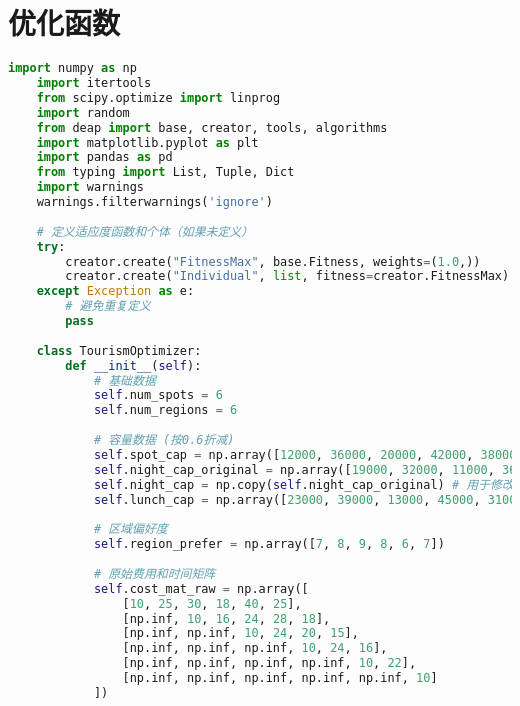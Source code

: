 \section[\hspace{-2pt}优化函数]{{\heiti{} \hspace{-8pt}优化函数}}
\begin{lstlisting}[language=Python]
    import numpy as np
    import itertools
    from scipy.optimize import linprog
    import random
    from deap import base, creator, tools, algorithms
    import matplotlib.pyplot as plt
    import pandas as pd
    from typing import List, Tuple, Dict
    import warnings
    warnings.filterwarnings('ignore')
    
    # 定义适应度函数和个体（如果未定义）
    try:
        creator.create("FitnessMax", base.Fitness, weights=(1.0,))
        creator.create("Individual", list, fitness=creator.FitnessMax)
    except Exception as e:
        # 避免重复定义
        pass
    
    class TourismOptimizer:
        def __init__(self):
            # 基础数据
            self.num_spots = 6
            self.num_regions = 6
            
            # 容量数据 (按0.6折减)
            self.spot_cap = np.array([12000, 36000, 20000, 42000, 38000, 30000]) * 0.6
            self.night_cap_original = np.array([19000, 32000, 11000, 36000, 23000, 22000]) * 0.6
            self.night_cap = np.copy(self.night_cap_original) # 用于修改的容量
            self.lunch_cap = np.array([23000, 39000, 13000, 45000, 31000, 28000]) * 0.6
            
            # 区域偏好度
            self.region_prefer = np.array([7, 8, 9, 8, 6, 7])
            
            # 原始费用和时间矩阵
            self.cost_mat_raw = np.array([
                [10, 25, 30, 18, 40, 25],
                [np.inf, 10, 16, 24, 28, 18],
                [np.inf, np.inf, 10, 24, 20, 15],
                [np.inf, np.inf, np.inf, 10, 24, 16],
                [np.inf, np.inf, np.inf, np.inf, 10, 22],
                [np.inf, np.inf, np.inf, np.inf, np.inf, 10]
            ])
            

\end{lstlisting}
